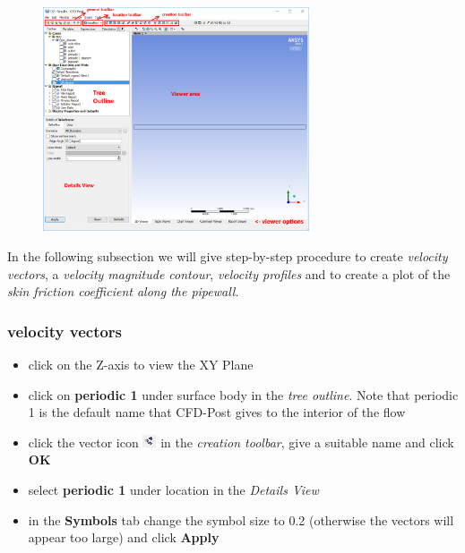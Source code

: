 \documentclass[11pt,a4paper,oneside]{scrartcl}
\newcommand\bfr[1]{\textcolor[rgb]{1,0.00,0.00}{\textbf{\textsf{#1}}}}
\begin{document}
\begin{figure}[H]
\begin{center}
\includegraphics[width=0.7\textwidth,clip]{CFDPost_GUI.png}
\end{center}
\end{figure}

In the following subsection we will give step-by-step procedure to create \emph{velocity vectors}, a \emph{velocity magnitude contour}, \emph{velocity profiles} and to create a plot of the \emph{skin friction coefficient along the pipewall}.

\subsubsection{velocity vectors}

\begin{itemize}
\item click on the Z-axis to view the XY Plane
\item click on \bfr{periodic 1} under surface body in the \emph{tree outline}. Note that periodic 1 is the default name that CFD-Post gives to the interior of the flow
\item click the vector icon \includegraphics[width=0.4cm]{vector_icon.png} in the \emph{creation toolbar}, give a suitable name and click \bfr{OK}
\item select \bfr{periodic 1}  under location in the \emph{Details View}
\item in the \bfr{Symbols} tab change the symbol size to 0.2 (otherwise the vectors will appear too large) and click \bfr{Apply}
\end{itemize}
\end{document}
